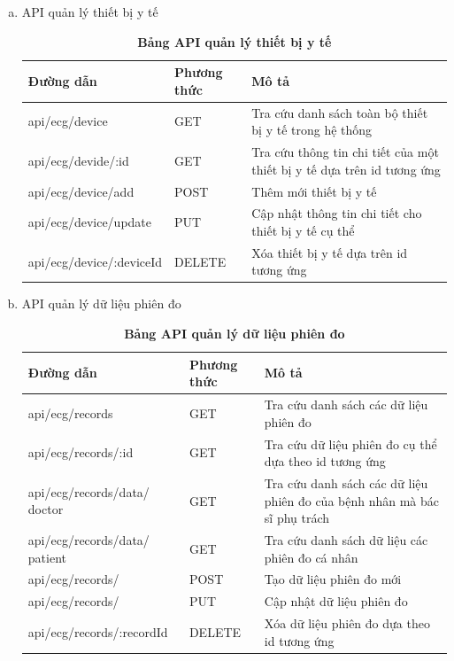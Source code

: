 \begin{enumerate}[a)]
	  \item API quản lý thiết bị y tế
	  \begin{xltabular}{\textwidth}{
		| >{\raggedright\arraybackslash}m{4.8cm}
		| >{\centering\arraybackslash}m{2.8cm}
		| >{\raggedright\arraybackslash}X |
		}
		\caption{\bfseries \fontsize{12pt}{0pt}\selectfont Bảng API quản lý thiết bị y tế}
		\label{table_api_device}
		\\
		\hline
		\bfseries Đường dẫn    &\bfseries Phương thức    &\bfseries Mô tả\\ \hline
		api/ecg/device   &   GET  & Tra cứu danh sách toàn bộ thiết bị y tế trong hệ thống\\ \hline
		api/ecg/devide/:id   &    GET    & Tra cứu thông tin chi tiết của một thiết bị y tế dựa trên id tương ứng \\ \hline
		api/ecg/device/add &   POST     & Thêm mới thiết bị y tế \\ \hline
		api/ecg/device/update  &     PUT   & Cập nhật thông tin chi tiết cho thiết bị y tế cụ thể \\ \hline
		api/ecg/device/:deviceId  &     DELETE   & Xóa thiết bị y tế dựa trên id tương ứng \\ \hline
	  \end{xltabular}
	  
	  \item API quản lý dữ liệu phiên đo
	  \begin{xltabular}{\textwidth}{
		| >{\raggedright\arraybackslash}p{5cm}
		| >{\centering\arraybackslash}m{2.8cm}
		| >{\raggedright\arraybackslash}X |
		}
		\caption{\bfseries \fontsize{12pt}{0pt}\selectfont Bảng API quản lý dữ liệu phiên đo}
		\label{table_api_record}
		\\
		\hline
		\bfseries Đường dẫn    &\bfseries Phương thức    &\bfseries Mô tả \\ \hline
		 api/ecg/records   &   GET  & Tra cứu danh sách các dữ liệu phiên đo \\ \hline
		 api/ecg/records/:id   &    GET    & Tra cứu dữ liệu phiên đo cụ thể dựa theo id tương ứng \\ \hline
		 api/ecg/records/data/ doctor &   GET     & Tra cứu danh sách các dữ liệu phiên đo của bệnh nhân mà bác sĩ phụ trách \\ \hline
		 api/ecg/records/data/ patient &   GET     & Tra cứu danh sách dữ liệu các phiên đo cá nhân \\ \hline
		 api/ecg/records/   &    POST    & Tạo dữ liệu phiên đo mới \\ \hline
		 api/ecg/records/   &    PUT    & Cập nhật dữ liệu phiên đo \\ \hline
		 api/ecg/records/:recordId  &    DELETE    & Xóa dữ liệu phiên đo dựa theo id tương ứng \\ \hline
		\end{xltabular}
	  

\end{enumerate}
